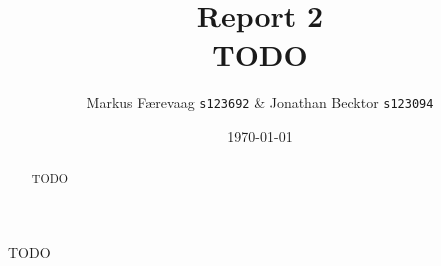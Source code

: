 \documentclass[11pt]{article}
\begin{document}
\title{{Report 2}\\{\bf TODO}}

\author{Markus Færevaag {\tt s123692} \& Jonathan Becktor {\tt s123094}}

\date{\today}

\maketitle

\begin{abstract}
  TODO
\end{abstract}

TODO
\end{document}
